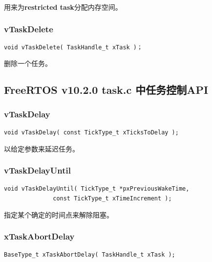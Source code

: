 \documentclass[12pt, a4paper]{article}
\begin{document}
用来为\textbf{restricted task}分配内存空间。

\subsubsection {vTaskDelete}

\begin{lstlisting}[language={[ANSI]C},keywordstyle=\color{blue!70},commentstyle=\color{red!50!green!50!blue!50},frame=shadowbox, rulesepcolor=\color{red!20!green!20!blue!20}]
void vTaskDelete( TaskHandle_t xTask )；
\end{lstlisting}

删除一个任务。


\subsection {FreeRTOS v10.2.0 task.c 中任务控制API}

\subsubsection {vTaskDelay}

\begin{lstlisting}[language={[ANSI]C},keywordstyle=\color{blue!70},commentstyle=\color{red!50!green!50!blue!50},frame=shadowbox, rulesepcolor=\color{red!20!green!20!blue!20}]
void vTaskDelay( const TickType_t xTicksToDelay );
\end{lstlisting}

以给定参数来延迟任务。

\subsubsection {vTaskDelayUntil}

\begin{lstlisting}[language={[ANSI]C},keywordstyle=\color{blue!70},commentstyle=\color{red!50!green!50!blue!50},frame=shadowbox, rulesepcolor=\color{red!20!green!20!blue!20}]
void vTaskDelayUntil( TickType_t *pxPreviousWakeTime, 
		      const TickType_t xTimeIncrement );
\end{lstlisting}

指定某个确定的时间点来解除阻塞。

\subsubsection {xTaskAbortDelay}

\begin{lstlisting}[language={[ANSI]C},keywordstyle=\color{blue!70},commentstyle=\color{red!50!green!50!blue!50},frame=shadowbox, rulesepcolor=\color{red!20!green!20!blue!20}]
BaseType_t xTaskAbortDelay( TaskHandle_t xTask );
\end{lstlisting}
\end{document}
